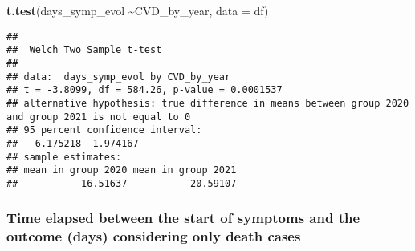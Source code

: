 \documentclass[
]{article}
\newenvironment{Shaded}{\begin{snugshade}}{\end{snugshade}}
\newcommand{\AttributeTok}[1]{\textcolor[rgb]{0.13,0.29,0.53}{#1}}
\newcommand{\FunctionTok}[1]{\textcolor[rgb]{0.13,0.29,0.53}{\textbf{#1}}}
\newcommand{\NormalTok}[1]{#1}
\newcommand{\OtherTok}[1]{\textcolor[rgb]{0.56,0.35,0.01}{#1}}
\newcommand{\SpecialCharTok}[1]{\textcolor[rgb]{0.81,0.36,0.00}{\textbf{#1}}}
\newcommand{\StringTok}[1]{\textcolor[rgb]{0.31,0.60,0.02}{#1}}
\begin{document}
\begin{Shaded}
\begin{Highlighting}[]
\FunctionTok{t.test}\NormalTok{(days\_symp\_evol }\SpecialCharTok{\textasciitilde{}}\NormalTok{CVD\_by\_year, }\AttributeTok{data =}\NormalTok{ df)}
\end{Highlighting}
\end{Shaded}

\begin{verbatim}
## 
##  Welch Two Sample t-test
## 
## data:  days_symp_evol by CVD_by_year
## t = -3.8099, df = 584.26, p-value = 0.0001537
## alternative hypothesis: true difference in means between group 2020 and group 2021 is not equal to 0
## 95 percent confidence interval:
##  -6.175218 -1.974167
## sample estimates:
## mean in group 2020 mean in group 2021 
##           16.51637           20.59107
\end{verbatim}

\hypertarget{time-elapsed-between-the-start-of-symptoms-and-the-outcome-days-considering-only-death-cases}{%
\subsubsection{Time elapsed between the start of symptoms and the
outcome (days) considering only death
cases}\label{time-elapsed-between-the-start-of-symptoms-and-the-outcome-days-considering-only-death-cases}}

\begin{Shaded}
\end{Shaded}
\end{document}
